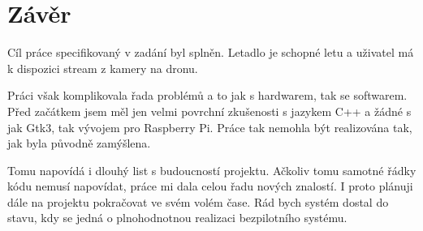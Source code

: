 \chapter*{Závěr}

Cíl práce specifikovaný v zadání byl splněn.
Letadlo je schopné letu a uživatel má k dispozici stream z kamery na dronu.

Práci však komplikovala řada problémů a to jak s hardwarem, tak se softwarem.
Před začátkem jsem měl jen velmi povrchní zkušenosti s jazykem C++ a žádné s jak Gtk3, tak vývojem pro Raspberry Pi.
Práce tak nemohla být realizována tak, jak byla původně zamýšlena.

Tomu napovídá i dlouhý list s budoucností projektu.
Ačkoliv tomu samotné řádky kódu nemusí napovídat, práce mi dala celou řadu nových znalostí.
I proto plánuji dále na projektu pokračovat ve svém volém čase.
Rád bych systém dostal do stavu, kdy se jedná o plnohodnotnou realizaci bezpilotního systému.

